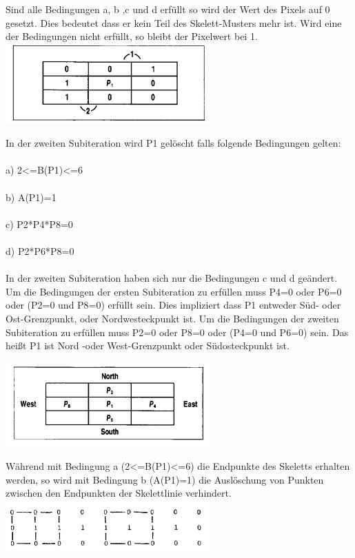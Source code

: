 \documentclass[appendixprefix,a4paper,bibliography=totoc,twoside=true,11pt,DIV=11,BCOR=6mm,headsepline,pointlessnumbers]{scrbook}
\begin{document}
Sind alle Bedingungen a, b ,c und d erfüllt so wird der Wert des Pixels auf 0 gesetzt.
Dies bedeutet dass er kein Teil des Skelett-Musters mehr ist.
Wird eine der Bedingungen nicht erfüllt, so bleibt der Pixelwert bei 1.\\

\includegraphics[width=8cm]{Res/01Folgen.png}


In der zweiten Subiteration wird P1 gelöscht falls folgende Bedingungen gelten: \\ \\
a) 2<=B(P1)<=6 \\ \\
b) A(P1)=1 \\ \\
c) P2*P4*P8=0 \\ \\
d) P2*P6*P8=0 \\ \\
In der zweiten Subiteration haben sich nur die Bedingungen c und d geändert.\\

Um die Bedingungen der ersten Subiteration zu erfüllen muss
P4=0 oder P6=0 oder (P2=0 und P8=0)  erfüllt sein.
Dies impliziert dass P1 entweder Süd- oder Ost-Grenzpunkt, oder Nordwesteckpunkt ist.
Um die Bedingungen der zweiten Subiteration zu erfüllen muss
P2=0 oder P8=0 oder (P4=0 und P6=0) sein.
Das heißt P1 ist Nord -oder West-Grenzpunkt oder Südosteckpunkt ist.

\includegraphics[width=8cm]{Res/Orientierung.png}


Während mit Bedingung a (2<=B(P1)<=6) die Endpunkte des Skeletts erhalten werden, so wird mit Bedingung b (A(P1)=1) die Auslöschung von Punkten zwischen den Endpunkten der Skelettlinie verhindert.\\

\includegraphics[width=8cm]{Res/EndpktVerbheit.png}
\end{document}
